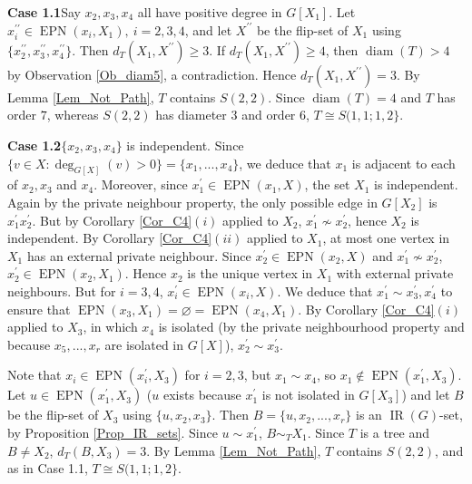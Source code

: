 \documentclass[12pt]{article}%
\begin{document}
\noindent\textbf{Case 1.1\hspace{0.1in}}Say $x_{2},x_{3},x_{4}$ all have
positive degree in $G[X_{1}]$. Let $x_{i}^{\prime\prime}\in\operatorname{EPN}%
(x_{i},X_{1}),\ i=2,3,4$, and let $X^{\prime\prime}$ be the flip-set of
$X_{1}$ using $\{x_{2}^{\prime\prime},x_{3}^{\prime\prime},x_{4}^{\prime
\prime}\}$. Then $d_{T}(X_{1},X^{\prime\prime})\geq3$. If $d_{T}%
(X_{1},X^{\prime\prime})\geq4$, then $\operatorname{diam}(T)>4$ by Observation
\ref{Ob_diam5}, a contradiction. Hence $d_{T}(X_{1},X^{\prime\prime})=3$. By
Lemma \ref{Lem_Not_Path}, $T$ contains $S(2,2)$. Since $\operatorname{diam}%
(T)=4$ and $T$ has order $7$, whereas $S(2,2)$ has diameter $3$ and order $6$,
$T\cong S(1,1;1,2\}$.\medskip

\noindent\textbf{Case 1.2\hspace{0.1in}}$\{x_{2},x_{3},x_{4}\}$ is
independent. Since $\{v\in X:\deg_{G[X]}(v)>0\}=\{x_{1},...,x_{4}\}$, we
deduce that $x_{1}$ is adjacent to each of $x_{2},x_{3}$ and $x_{4}$.
Moreover, since $x_{1}^{\prime}\in\operatorname{EPN}(x_{1},X)$, the set
$X_{1}$ is independent. Again by the private neighbour property, the only
possible edge in $G[X_{2}]$ is $x_{1}^{\prime}x_{2}^{\prime}$. But by
Corollary \ref{Cor_C4}$(i)$ applied to $X_{2}$, $x_{1}^{\prime}\nsim
x_{2}^{\prime}$, hence $X_{2}$ is independent. By Corollary \ref{Cor_C4}$(ii)$
applied to $X_{1}$, at most one vertex in $X_{1}$ has an external private
neighbour. Since $x_{2}^{\prime}\in\operatorname{EPN}(x_{2},X)$ and
$x_{1}^{\prime}\nsim x_{2}^{\prime}$, $x_{2}^{\prime}\in\operatorname{EPN}%
(x_{2},X_{1})$. Hence $x_{2}$ is the unique vertex in $X_{1}$ with external
private neighbours. But for $i=3,4$, $x_{i}^{\prime}\in\operatorname{EPN}%
(x_{i},X)$. We deduce that $x_{1}^{\prime}\sim x_{3}^{\prime},x_{4}^{\prime}$
to ensure that $\operatorname{EPN}(x_{3},X_{1})=\varnothing=\operatorname{EPN}%
(x_{4},X_{1})$. By Corollary \ref{Cor_C4}$(i)$ applied to $X_{3}$, in which
$x_{4}$ is isolated (by the private neighbourhood property and because
$x_{5},...,x_{r}$ are isolated in $G[X]$), $x_{2}^{\prime}\sim x_{3}^{\prime}$.

Note that $x_{i}\in\operatorname{EPN}(x_{i}^{\prime},X_{3})$ for $i=2,3$, but
$x_{1}\sim x_{4}$, so $x_{1}\notin\operatorname{EPN}(x_{1}^{\prime},X_{3})$.
Let $u\in\operatorname{EPN}(x_{1}^{\prime},X_{3})$ ($u$ exists because
$x_{1}^{\prime}$ is not isolated in $G[X_{3}]$) and let $B$ be the flip-set of
$X_{3}$ using $\{u,x_{2},x_{3}\}$. Then $B=\{u,x_{2},...,x_{r}\}$ is an
$\operatorname{IR}(G)$-set, by Proposition \ref{Prop_IR_sets}. Since $u\sim
x_{1}^{\prime}$, $B\sim_{T}X_{1}$. Since $T$ is a tree and $B\neq X_{2}$,
$d_{T}(B,X_{3})=3$. By Lemma \ref{Lem_Not_Path}, $T$ contains $S(2,2)$, and as
in Case 1.1, $T\cong S(1,1;1,2\}$.\medskip
\end{document}
